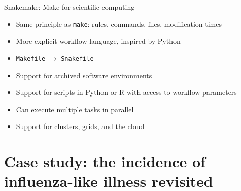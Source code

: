 \documentclass[aspectratio=169]{beamer}
\begin{document}
\begin{frame}{Snakemake: Make for scientific computing}

  \begin{itemize}
  \item Same principle as \texttt{make}: rules, commands, files, modification times
  \item More explicit workflow language, inspired by Python
  \item \texttt{Makefile} $\to$ \texttt{Snakefile}
  \item Support for archived software environments
  \item Support for scripts in Python or R with access to workflow parameters
  \item Can execute multiple tasks in parallel
  \item Support for clusters, grids, and the cloud
  \end{itemize}

\end{frame}

\section*{Case study: the incidence of influenza-like illness revisited}

\begin{frame}{}

\end{frame}

\begin{frame}{}

\end{frame}
\end{document}
